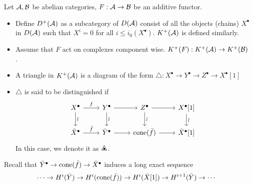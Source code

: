 \begin{definition}
  Let $\mathcal{A}, \mathcal{B}$ be abelian categories, $F: \mathcal{A} \to \mathcal{B}$ be an additive functor.
  \begin{itemize}
    \item Define $D^+(\mathcal{A})$ as a subcategory of $D(\mathcal{A})$
      consist of all the objects (chains) $X^\bullet$ in $D(\mathcal{A})$
      such that $X^i = 0$ for all $i \leq i_0(X^\bullet)$.
      $K^+(\mathcal{A})$ is defined similarly.
    \item Assume that $F$ act on complexes component wise.
      $K^+(F) : K^+(\mathcal{A}) \to K^+(\mathcal{B})$.
    \item A triangle in $K^+(\mathcal{A})$ is a diagram of the form
      $\triangle: X^\bullet \to Y^\bullet \to Z^\bullet \to X^\bullet[1]$
    \item $\triangle$ is said to be distinguished if
      \[ \begin{tikzcd}
          X^\bullet \ar[r, "f"] \ar[d, "\rotatebox{90}{\(\sim\)}"] &
          Y^\bullet \ar[r] \ar[d, "\rotatebox{90}{\(\sim\)}"] &
          Z^\bullet \ar[r] \ar[d, "\rotatebox{90}{\(\sim\)}"] &
          X^\bullet[1] \ar[d, "\rotatebox{90}{\(\sim\)}"] \\
          \bar{X}^\bullet \ar[r, "\bar{f}"] &
          \bar{Y}^\bullet \ar[r] &
          \cone(\bar{f}) \ar[r] &
          \bar{X}^\bullet[1]
      \end{tikzcd} \]
    In this case, we denote it as $\tridot$.
  \end{itemize}
\end{definition}

Recall that $\bar{Y}^\bullet \to \operatorname{cone}(\bar{f}) \to \bar{X}^\bullet$
induces a long exact sequence
\[ \cdots \to H^i(\bar{Y}) \to H^i(\operatorname{cone}(\bar{f}))
  \to H^i(\bar{X}[1]) \to H^{i+1}(\bar{Y}) \to \cdots \]

